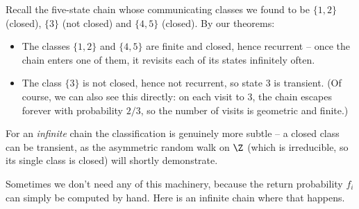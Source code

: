 \begin{example}
	Recall the five-state chain whose communicating classes we found to be $\{1, 2\}$ (closed), $\{3\}$ (not closed) and $\{4, 5\}$ (closed). By our theorems:
	\begin{itemize}
		\item The classes $\{1, 2\}$ and $\{4, 5\}$ are finite and closed, hence recurrent -- once the chain enters one of them, it revisits each of its states infinitely often.
		\item The class $\{3\}$ is not closed, hence not recurrent, so state 3 is transient. (Of course, we can also see this directly: on each visit to 3, the chain escapes forever with probability $2/3$, so the number of visits is geometric and finite.)
	\end{itemize}
	For an \emph{infinite} chain the classification is genuinely more subtle -- a closed class can be transient, as the asymmetric random walk on $\Z$ (which is irreducible, so its single class is closed) will shortly demonstrate.
\end{example}

Sometimes we don't need any of this machinery, because the return probability $f_i$ can simply be computed by hand. Here is an infinite chain where that happens.

